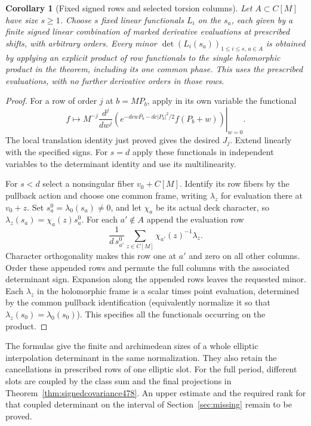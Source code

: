 \documentclass[a4paper,11pt]{article}
\newtheorem{corollary}[proposition]{Corollary}
\theoremstyle{definition}
\theoremstyle{remark}
\numberwithin{equation}{section}
\begin{document}
\begin{corollary}[Fixed signed rows and selected torsion columns]\leavevmode
\label{cor:fixedminor486}
Let \(A\subset C[M]\) have size \(s\ge1\). Choose \(s\) fixed
linear functionals \(L_i\) on the \(s_a\), each given by a
finite signed linear combination of marked derivative
evaluations at prescribed shifts, with arbitrary orders. Every
minor \(\det(L_i(s_a))_{1\le i\le s,\,a\in A}\)
is obtained by applying an explicit product
of row functionals to the single holomorphic product in the
theorem, including its one common phase. This uses the prescribed
evaluations, with no further derivative orders in those rows.
\end{corollary}
\begin{proof}
For a row of order \(j\) at \(b=MP_b\), apply in its own
variable the functional
\[
 f\longmapsto M^{-j}\left.\frac{d^j}{dw^j}
   \left(e^{-dcw\overline{P_b}-dc|P_b|^2/2}f(P_b+w)\right)
                                                   \right|_{w=0}.
\]
The local translation identity just proved gives the desired
\(J_j\). Extend linearly with the specified signs. For \(s=d\)
apply these functionals in independent variables to the determinant
identity and use its multilinearity.

For \(s<d\) select a nonsingular fiber \(v_0+C[M]\). Identify
its row fibers by the pullback action and choose one common
frame, writing \(\lambda_z\) for evaluation there at \(v_0+z\).
Set \(s_a^0=\lambda_0(s_a)\ne0\), and let \(\chi_a\) be its
actual deck character, so \(\lambda_z(s_a)=\chi_a(z)s_a^0\).
For each \(a'\notin A\) append the evaluation row
\[
        \frac{1}{d\,s_{a'}^0}\sum_{z\in C[M]}
                                  \chi_{a'}(z)^{-1}\lambda_z .
\]
Character orthogonality makes this row one at \(a'\) and zero
on all other columns. Order these appended rows and permute
the full columns with the associated determinant sign. Expansion
along the appended rows leaves the requested minor. Each
\(\lambda_z\) in the holomorphic frame is a scalar times point
evaluation, determined by the common pullback identification
(equivalently normalize it so that \(\lambda_z(s_0)=\lambda_0(s_0)\)).
This specifies all the functionals occurring on the product.
\end{proof}

The formulas give the finite and archimedean sizes of a whole
elliptic interpolation determinant in the same normalization.
They also retain the cancellations in prescribed rows of one
elliptic slot. For the full period, different slots are coupled
by the class sum and the final projections in
Theorem~\ref{thm:signedcovariance478}. An upper estimate and
the required rank for that coupled determinant on the interval
of Section~\ref{sec:missing} remain to be proved.
\end{document}
